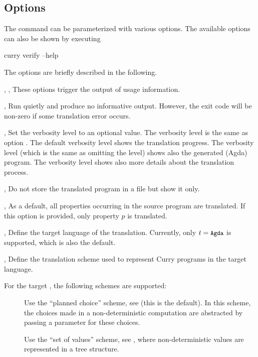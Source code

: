 \subsection{Options}

The command  can be parameterized
with various options.
The available options can also be shown by executing
\begin{curry}
curry verify --help
\end{curry}
The options are briefly described in the following.

\begin{description}
\item{, , }
These options trigger the output of usage information.

\item{, }
Run quietly and produce no informative output.
However, the exit code will be non-zero if some translation error occurs.

\item{, }
Set the verbosity level to an optional value.
The verbosity level  is the same as option .
The default verbosity level  shows the translation progress.
The verbosity level  (which is the same as omitting the level)
shows also the generated (Agda) program.
The verbosity level  shows also more details about
the translation process.

\item{, }
Do not store the translated program in a file but show it only.

\item{, }
As a default, all properties occurring in the source program are
translated. If this option is provided, only property $p$ is translated.

\item{, }
Define the target language of the translation.
Currently, only $t = \code{Agda}$ is supported, which is also the
default.

\item{, }
Define the translation scheme used to represent Curry programs
in the target language.

For the target , the following schemes are supported:
\begin{description}
\item[]
Use the ``planned choice'' scheme, see \cite{AntoyHanusLibby16}
(this is the default).
In this scheme, the choices made in a non-deterministic computation
are abstracted by passing a parameter for these choices.
\item[]
Use the ``set of values'' scheme, see \cite{AntoyHanusLibby16},
where non-deterministic values are represented in a tree structure.
\end{description}

\end{description}

